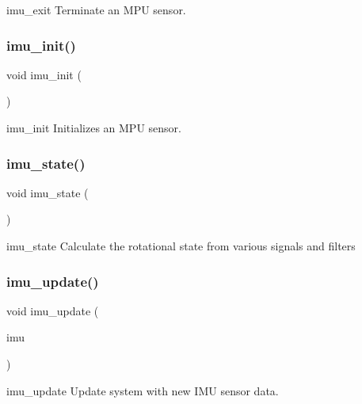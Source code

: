imu\+\_\+exit Terminate an M\+PU sensor. \mbox{\label{imu_8c_a86a06fe7a9831292bd92867da2d12f80}} 
\subsubsection{imu\+\_\+init()}
{\footnotesize\ttfamily void imu\+\_\+init (\begin{DoxyParamCaption}\item[{void}]{ }\end{DoxyParamCaption})}

imu\+\_\+init Initializes an M\+PU sensor. \mbox{\label{imu_8c_a5ca8497ef3bdd15a3b779302d2c1acc1}} 
\subsubsection{imu\+\_\+state()}
{\footnotesize\ttfamily void imu\+\_\+state (\begin{DoxyParamCaption}\item[{void}]{ }\end{DoxyParamCaption})}

imu\+\_\+state Calculate the rotational state from various signals and filters \mbox{\label{imu_8c_a38a1db0ae278088ee76fc6db380f209a}} 
\subsubsection{imu\+\_\+update()}
{\footnotesize\ttfamily void imu\+\_\+update (\begin{DoxyParamCaption}\item[{\textbf{ imu\+\_\+struct} $\ast$}]{imu }\end{DoxyParamCaption})}

imu\+\_\+update Update system with new I\+MU sensor data. 